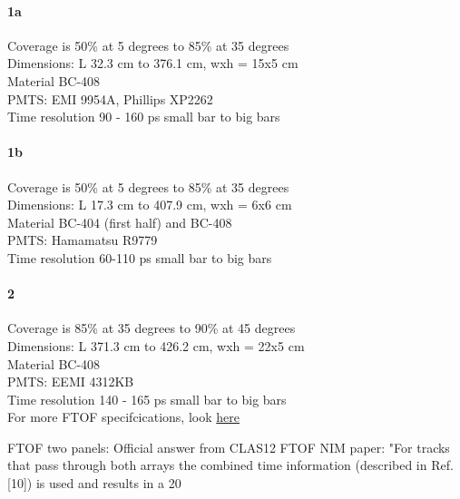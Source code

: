             \paragraph{1a}
                Coverage is 50\% at 5 degrees to 85\% at 35 degrees\\
                Dimensions: L 32.3 cm to 376.1 cm, wxh = 15x5 cm\\
                Material BC-408\\
                PMTS: EMI 9954A, Phillips XP2262\\
                Time resolution 90 - 160 ps small bar to big bars\\
            \paragraph{1b}
                Coverage is 50\% at 5 degrees to 85\% at 35 degrees\\
                Dimensions: L 17.3 cm to 407.9 cm, wxh = 6x6 cm\\
                Material BC-404 (first half) and BC-408\\
                PMTS: Hamamatsu R9779\\
                Time resolution 60-110 ps small bar to big bars\\
            \paragraph{2}
                Coverage is 85\% at 35 degrees to 90\% at 45 degrees\\
                Dimensions: L 371.3 cm to 426.2 cm, wxh = 22x5 cm\\
                Material BC-408\\
                PMTS: EEMI 4312KB\\
                Time resolution 140 - 165 ps small bar to big bars\\
           
           
            For more FTOF specifcications, look \href{https://www.jlab.org/Hall-B/ftof/notes/ftof_geom.pdf}{here} 
                
            FTOF two panels:
Official answer from CLAS12 FTOF NIM paper:
"For tracks that pass through both arrays the combined time information (described in Ref. [10]) is used and results in a 20%

